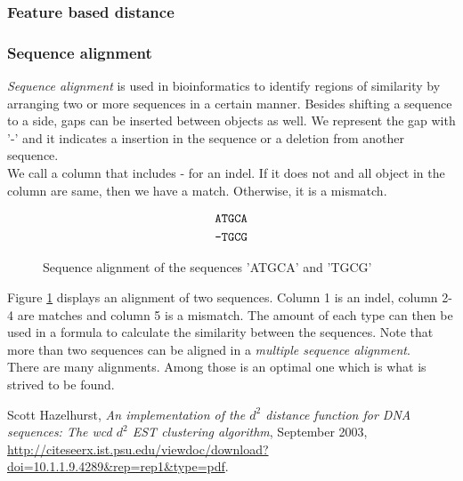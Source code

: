 \documentclass[11pt,a4paper]{article}
\begin{document}
\subsubsection{Feature based distance}



\subsubsection{Sequence alignment}
\emph{Sequence alignment} is used in bioinformatics to identify regions of similarity by arranging two or more sequences in a certain manner. Besides shifting a sequence to a side, gaps can be inserted between objects as well. We represent the gap with '-' and it indicates a insertion in the sequence or a deletion from another sequence.\\
We call a column that includes - for an indel. If it does not and all object in the column are same, then we have a match. Otherwise, it is a mismatch.\\
\begin{figure}[h!]
  \centering
  	  \begin{align*}
  	  	\mbox{\texttt{ATGCA}} \\
      	\mbox{\texttt{-TGCG}}
  	  \end{align*}
  \caption{Sequence alignment of the sequences 'ATGCA' and 'TGCG'}
  \label{fig:seqAlignment}
\end{figure}
Figure \ref{fig:seqAlignment} displays an alignment of two sequences. Column 1 is an indel, column 2-4 are matches and column 5 is a mismatch. The amount of each type can then be used in a formula to calculate the similarity between the sequences. Note that more than two sequences can be aligned in a \emph{multiple sequence alignment}. \\
There are many alignments. Among those is an optimal one which is what is strived to be found.


\begin{thebibliography}{9}
    Scott Hazelhurst,
    \emph{An implementation of the $d^2$ distance function for DNA
      sequences: The wcd $d^2$ EST clustering algorithm},
      September 2003,
      \url{http://citeseerx.ist.psu.edu/viewdoc/download?doi=10.1.1.9.4289&rep=rep1&type=pdf}.
\end{thebibliography}
\end{document}
